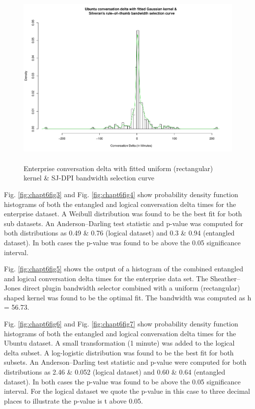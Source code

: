 \begin{figure}
\begin{center}
\caption{Enterprise conversation delta with fitted uniform (rectangular) kernel & \n SJ-DPI bandwidth selection curve}
\label{fig:chapt6fig8}
\includegraphics[height=9cm, width=13cm]{graphs/different/08_delta_kde_ubuntu.pdf} 
\end{center}
\end{figure}

Fig. \ref{fig:chapt6fig3} and Fig. \ref{fig:chapt6fig4} show probability density function histograms of both the entangled and logical conversation delta times for the enterprise dataset.  A Weibull distribution was found to be the best fit for both sub datasets.  An Anderson--Darling test statistic and p-value was computed for both distributions as 0.49 \& 0.76 (logical dataset) and 0.3 \& 0.94 (entangled dataset). In both cases the p-value was found to be above the 0.05 significance interval.

Fig. \ref{fig:chapt6fig5} shows the output of a histogram of the combined entangled and logical conversation delta times for the enterprise data set. The Sheather--Jones direct plugin bandwidth selector combined with a uniform (rectangular) shaped kernel was found to be the optimal fit.  The bandwidth was computed as h = 56.73.

Fig. \ref{fig:chapt6fig6} and Fig. \ref{fig:chapt6fig7} show probability density function histograms of both the entangled and logical conversation delta times for the Ubuntu dataset. A small transformation (1 minute) was added to the logical delta subset. A log-logistic distribution was found to be the best fit for both subsets.  An Anderson--Darling test statistic and p-value were computed for both distributions as 2.46 \& 0.052 (logical dataset) and 0.60 \&  0.64 (entangled dataset). In both cases the p-value was found to be above the 0.05 significance interval. For the logical dataset we quote the p-value in this case to three decimal places to illustrate the p-value is t above 0.05.


